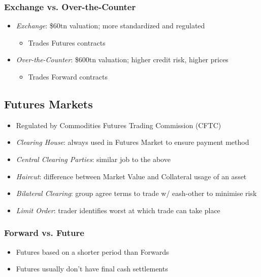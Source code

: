 \documentclass[11pt, english]{article}
\begin{document}
		\subsubsection{Exchange vs. Over-the-Counter}

	\begin{itemize}                              
        \setlength\itemsep{0cm}
		\item \textit{Exchange}: \$60tn valuation; more standardized and regulated
		\begin{itemize}
			\item Trades Futures contracts
		\end{itemize}
		\item \textit{Over-the-Counter}: \$600tn valuation; higher credit risk, higher prices
		\begin{itemize}
			\item Trades Forward contracts
		\end{itemize}
	\end{itemize}

\newpage

	\subsection{Futures Markets}

	\begin{itemize}        
        \setlength\itemsep{0cm}
		\item Regulated by Commodities Futures Trading Commission (CFTC)
		\item \textit{Clearing House}: always used in Futures Market to ensure payment method
		\item \textit{Central Clearing Parties}: similar job to the above
		\item \textit{Haircut}: difference between Market Value and Collateral usage of an asset
		\item \textit{Bilateral Clearing}: group agree terms to trade w/ eash-other to minimise risk
		\item \textit{Limit Order}: trader identifies worst at which trade can take place
	\end{itemize}

		\subsubsection{Forward vs. Future}

	\begin{itemize}             
        \setlength\itemsep{0cm}
		\item Futures based on a shorter period than Forwards
		\item Futures usually don't have final cash settlements
	\end{itemize}
\end{document}
